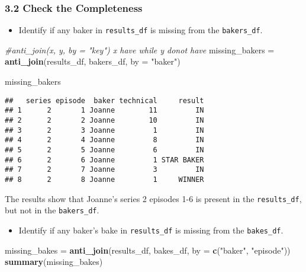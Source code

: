 \documentclass[
]{article}
\newenvironment{Shaded}{\begin{snugshade}}{\end{snugshade}}
\newcommand{\AttributeTok}[1]{\textcolor[rgb]{0.13,0.29,0.53}{#1}}
\newcommand{\CommentTok}[1]{\textcolor[rgb]{0.56,0.35,0.01}{\textit{#1}}}
\newcommand{\FunctionTok}[1]{\textcolor[rgb]{0.13,0.29,0.53}{\textbf{#1}}}
\newcommand{\NormalTok}[1]{#1}
\newcommand{\OtherTok}[1]{\textcolor[rgb]{0.56,0.35,0.01}{#1}}
\newcommand{\StringTok}[1]{\textcolor[rgb]{0.31,0.60,0.02}{#1}}
\providecommand{\tightlist}{%
  \setlength{\itemsep}{0pt}\setlength{\parskip}{0pt}}
\begin{document}
\subsubsection{3.2 Check the Completeness}\label{check-the-completeness}

\begin{itemize}
\tightlist
\item
  Identify if any baker in \texttt{results\_df} is missing from the
  \texttt{bakers\_df}.
\end{itemize}

\begin{Shaded}
\begin{Highlighting}[]
\CommentTok{\#anti\_join(x, y, by = "key")  x have while y donot have}
\NormalTok{missing\_bakers }\OtherTok{=} \FunctionTok{anti\_join}\NormalTok{(results\_df, bakers\_df, }\AttributeTok{by =} \StringTok{"baker"}\NormalTok{) }

\NormalTok{missing\_bakers}
\end{Highlighting}
\end{Shaded}

\begin{verbatim}
##   series episode  baker technical     result
## 1      2       1 Joanne        11         IN
## 2      2       2 Joanne        10         IN
## 3      2       3 Joanne         1         IN
## 4      2       4 Joanne         8         IN
## 5      2       5 Joanne         6         IN
## 6      2       6 Joanne         1 STAR BAKER
## 7      2       7 Joanne         3         IN
## 8      2       8 Joanne         1     WINNER
\end{verbatim}

The results show that Joanne's series 2 episodes 1-6 is present in the
\texttt{results\_df}, but not in the \texttt{bakers\_df}.

\begin{itemize}
\tightlist
\item
  Identify if any baker's bake in \texttt{results\_df} is missing from
  the \texttt{bakes\_df}.
\end{itemize}

\begin{Shaded}
\begin{Highlighting}[]
\NormalTok{missing\_bakes }\OtherTok{=} \FunctionTok{anti\_join}\NormalTok{(results\_df, bakes\_df, }\AttributeTok{by =} \FunctionTok{c}\NormalTok{(}\StringTok{"baker"}\NormalTok{, }\StringTok{"episode"}\NormalTok{)) }
\FunctionTok{summary}\NormalTok{(missing\_bakes)}
\end{Highlighting}
\end{Shaded}
\end{document}
